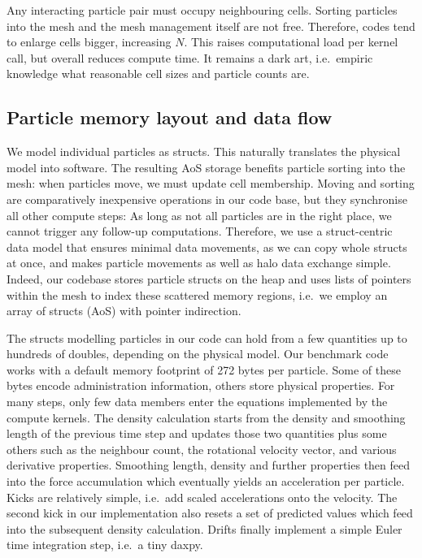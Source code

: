 Any interacting particle pair must occupy neighbouring cells.
Sorting particles into the mesh and the mesh management itself are not free.
Therefore, codes tend to enlarge cells bigger, increasing $N$.
This raises computational load per kernel call, but overall reduces compute time.
It remains a dark art, i.e.~empiric knowledge what reasonable cell sizes and particle counts are.



\subsection{Particle memory layout and data flow}

We model individual particles as structs.
This naturally translates the physical model into software. 
The resulting AoS storage benefits particle sorting into the mesh: when particles move, we must update cell membership. 
Moving and sorting are comparatively inexpensive operations in our code base, but they synchronise all other compute steps:
As long as not all particles are in the right place, we cannot trigger any follow-up computations.
Therefore, we use a struct-centric data model that ensures minimal data movements, as we can copy whole structs at once, and makes particle movements as well as halo data exchange simple.
Indeed, our codebase stores particle structs on the heap and uses lists of pointers within the mesh to index these scattered memory regions, i.e.~we employ an array of structs (AoS) with pointer indirection.



The structs modelling particles in our code can hold from a few quantities up to hundreds of doubles, depending on the physical model.
Our benchmark code works with a default memory footprint of 272 bytes per particle.
Some of these bytes encode administration information, others store physical
properties.
For many steps, only few data members enter the equations implemented by the compute kernels.
The density calculation starts from the density and smoothing length of the
previous time step and updates those two quantities plus some others such as the neighbour count, the rotational velocity vector, and various derivative properties.
Smoothing length, density and further properties then feed into the force
accumulation which eventually yields an acceleration per particle.
Kicks are relatively simple, i.e.~add scaled accelerations onto the velocity.
The second kick in our implementation also resets a set of predicted values
which feed into the subsequent density calculation.
Drifts finally implement a simple Euler time integration step, i.e.~a tiny
daxpy.


